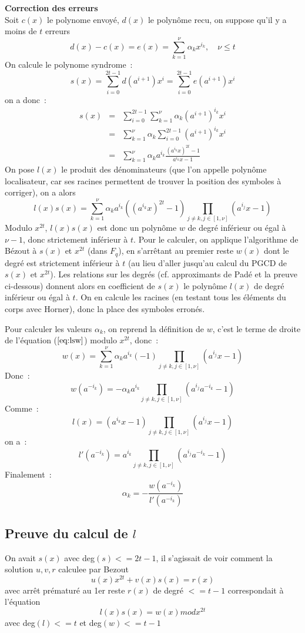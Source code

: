 \documentclass[a4paper,11pt]{book}
\begin{document}
\begin{giacjshere}
{\bf Correction des erreurs}\\ 
Soit $c(x)$ le polynome envoy\'e, $d(x)$
le polyn\^ome recu, on suppose qu'il y a moins de $t$ erreurs
\[d(x)-c(x)=e(x)= \sum_{k=1}^\nu \alpha_k x^{i_k}, \quad \nu \leq t\]
On calcule le polynome syndrome~:
\[ s(x)= \sum_{i=0}^{2t-1}d(a^{i+1}) x^i= \sum_{i=0}^{2t-1}e(a^{i+1}) x^i \]
on a donc~:
\begin{eqnarray*} 
s(x) &= &\sum_{i=0}^{2t-1}\sum_{k=1}^\nu \alpha_k (a^{i+1})^{i_k} x^i \\
&=& \sum_{k=1}^\nu \alpha_k \sum_{i=0}^{2t-1}(a^{i+1})^{i_k} x^i\\
&=& \sum_{k=1}^\nu \alpha_k a^{i_k} \frac{(a^{i_k}x)^{2t}-1}{a^{i_k}x-1}
\end{eqnarray*}
On pose $l(x)$ le produit des d\'enominateurs (que l'on appelle polyn\^ome
localisateur, car ses racines permettent de trouver la position
des symboles \`a corriger), on a alors
\begin{equation} \label{eq:lsw}
 l(x) s(x) = \sum_{k=1}^\nu \alpha_k a^{i_k} ( (a^{i_k}x)^{2t} -1 )
\prod_{j\neq k, j \in [1,\nu]} (a^{i_j}x -1) 
\end{equation}
Modulo $x^{2t}$, $l(x)s(x)$ est donc un polyn\^ome $w$ de degr\'e inf\'erieur
ou \'egal \`a $\nu -1$, donc strictement inf\'erieur \`a $t$.
Pour le calculer, on applique l'algorithme de B\'ezout à $s(x)$
et $x^{2t}$ (dans $F_q$), en s'arr\^etant au premier reste $w(x)$
dont le degr\'e est strictement inf\'erieur \`a $t$ (au lieu
d'aller jusqu'au calcul du PGCD de $s(x)$ et $x^{2t}$).
Les relations sur les degr\'es (cf. approximants de Pad\'e et
la preuve ci-dessous) donnent
alors en coefficient de $s(x)$ le polyn\^ome $l(x)$ de degr\'e inf\'erieur ou
\'egal \`a $t$. On en calcule les racines (en testant tous les \'el\'ements
du corps avec Horner), donc la place des symboles erron\'es.

Pour calculer les valeurs $\alpha_k$, on reprend la définition de $w$,
c'est le terme de droite de l'équation (\(\ref{eq:lsw}\)) modulo $x^{2t}$,
donc~:
\[ w(x)=\sum_{k=1}^\nu \alpha_k a^{i_k} (-1)
\prod_{j\neq k, j \in [1,\nu]} (a^{i_j}x-1) \]
Donc~:
\[ w(a^{-i_k}) = - \alpha_k a^{i_k}  
\prod_{j\neq k, j \in [1,\nu]} (a^{i_j} a^{-i_k} -1) \]
Comme~:
\[ l(x)=(a^{i_k}x-1)\prod_{j\neq k, j \in [1,\nu]} (a^{i_j}x-1) \]
on a~:
\[ l'(a^{-i_k})=a^{i_k}\prod_{j\neq k, j \in [1,\nu]} (a^{i_j}a^{-i_k}-1) \]
Finalement~:
\[ \alpha_k = -\frac{w(a^{-i_k})}{l'(a^{-i_k})} \]

\subsection{Preuve du calcul de $l$}
On avait $s(x)$ avec deg$(s)<=2t-1$,
il s'agissait de voir comment la solution $u,v,r$ calculee par Bezout
\begin{equation}   \label{eq:loc}
 u(x)  x^{2t}+ v(x) s(x) = r(x) 
\end{equation}
avec arr\^et pr\'ematur\'e au 1er reste $r(x)$ de degr\'e $<=t-1$ 
correspondait \`a l'\'equation
\[   l(x) s(x) = w(x) mod x^{2t} \]
avec deg$(l)<=t$ et deg$(w)<=t-1$


\end{giacjshere}
\end{document}
